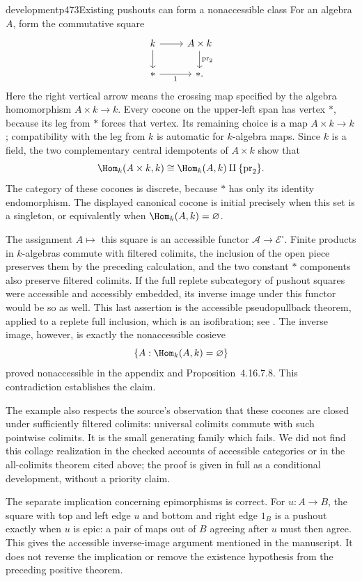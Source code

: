 \begin{dcomment}{development}{p473}{Existing pushouts can form a nonaccessible class}
For an algebra $A$, form the commutative square
\[
 \begin{tikzcd}
 k \arrow[r] \arrow[d] & A\times k \arrow[d,"\operatorname{pr}_2"]\\
 * \arrow[r,"1"'] & * .
 \end{tikzcd}
\]
Here the right vertical arrow means the crossing map specified by the algebra homomorphism $A\times k\to k$. Every cocone on the upper-left span has vertex $*$, because its leg from $*$ forces that vertex. Its remaining choice is a map $A\times k\to k$; compatibility with the leg from $k$ is automatic for $k$-algebra maps. Since $k$ is a field, the two complementary central idempotents of $A\times k$ show that
\[
 \Hom_k(A\times k,k)
 \cong\Hom_k(A,k)\amalg\{\operatorname{pr}_2\}.
\]
The category of these cocones is discrete, because $*$ has only its identity endomorphism. The displayed canonical cocone is initial precisely when this set is a singleton, or equivalently when $\Hom_k(A,k)=\varnothing$.

The assignment $A\mapsto$ this square is an accessible functor $\mathcal A\to\mathcal E^\square$. Finite products in $k$-algebras commute with filtered colimits, the inclusion of the open piece preserves them by the preceding calculation, and the two constant $*$ components also preserve filtered colimits. If the full replete subcategory of pushout squares were accessible and accessibly embedded, its inverse image under this functor would be so as well. This last assertion is the accessible pseudopullback theorem, applied to a replete full inclusion, which is an isofibration; see \citet[Remark~4.9]{BourkeLack2024}. The inverse image, however, is exactly the nonaccessible cosieve
\[
 \{A:\Hom_k(A,k)=\varnothing\}
\]
proved nonaccessible in the appendix and Proposition~4.16.7.8. This contradiction establishes the claim.

The example also respects the source's observation that these cocones are closed under sufficiently filtered colimits: universal colimits commute with such pointwise colimits. It is the small generating family which fails. We did not find this collage realization in the checked accounts of accessible categories or in the all-colimits theorem cited above; the proof is given in full as a conditional development, without a priority claim.

The separate implication concerning epimorphisms is correct. For $u:A\to B$, the square with top and left edge $u$ and bottom and right edge $1_B$ is a pushout exactly when $u$ is epic: a pair of maps out of $B$ agreeing after $u$ must then agree. This gives the accessible inverse-image argument mentioned in the manuscript. It does not reverse the implication or remove the existence hypothesis from the preceding positive theorem.
\end{dcomment}

